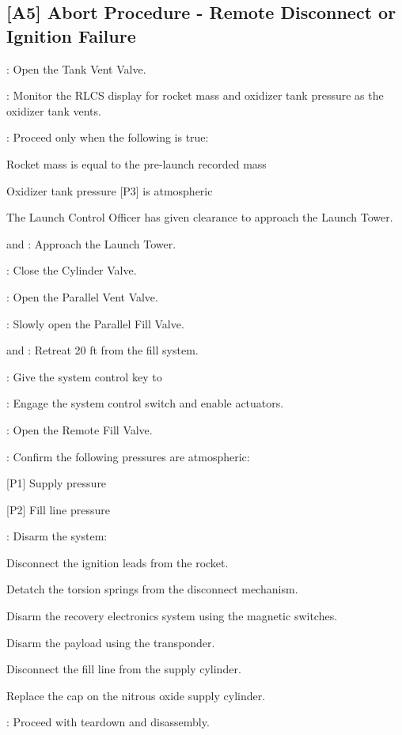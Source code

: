 \subsection{[A5] Abort Procedure - Remote Disconnect or Ignition Failure}
\begin{checklist}
    \item \control{}: Open the Tank Vent Valve.
    \item \control{}: Monitor the RLCS display for rocket mass and oxidizer tank pressure as the oxidizer tank vents.
    \item \ops{}: Proceed only when the following is true:
    \begin{checklist}
        \item Rocket mass is equal to the pre-launch recorded mass
        \item Oxidizer tank pressure [P3] is atmospheric
        \item The Launch Control Officer has given clearance to approach the Launch Tower.
    \end{checklist}
    \item \primary{} and \secondary: Approach the Launch Tower.
    \item \primary{}: Close the Cylinder Valve.
    \item \primary{}: Open the Parallel Vent Valve.
    \item \primary{}: Slowly open the Parallel Fill Valve.
    \item \primary{} and \secondary: Retreat 20 ft from the fill system.
    \item \ops: Give the system control key to \control{}
    \item \control{}: Engage the system control switch and enable actuators.
    \item \control{}: Open the Remote Fill Valve.
    \item \control{}: Confirm the following pressures are atmospheric:
    \begin{checklist}
        \item {[P1]} Supply pressure
        \item {[P2]} Fill line pressure
    \end{checklist}
    \item \primary{}: Disarm the system:
        \begin{checklist}    
            \item Disconnect the ignition leads from the rocket.
            \item Detatch the torsion springs from the disconnect mechanism.
            \item Disarm the recovery electronics system using the magnetic switches.
            \item Disarm the payload using the transponder.
            \item Disconnect the fill line from the supply cylinder.
            \item Replace the cap on the nitrous oxide supply cylinder.
        \end{checklist}
    \item \ops{}: Proceed with teardown and disassembly.
\end{checklist}

